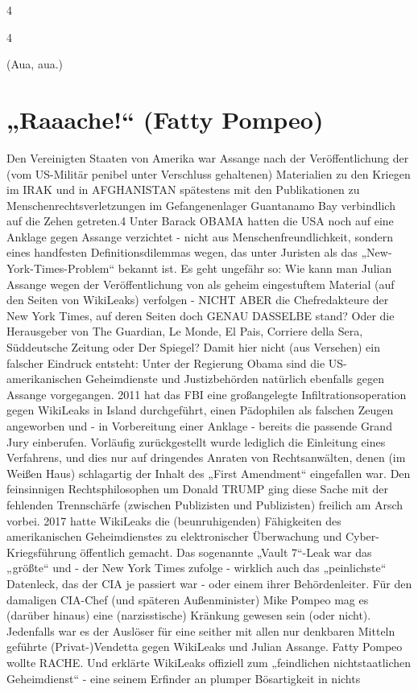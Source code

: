 \begin{multicols}{2}
4

4

(Aua, aua.)


\chapter{„Raaache!“ (Fatty Pompeo)}
Den Vereinigten Staaten von Amerika war Assange nach
der Veröffentlichung der (vom US-Militär penibel unter
Verschluss gehaltenen) Materialien zu den Kriegen im
IRAK und in AFGHANISTAN spätestens mit den Publikationen zu Menschenrechtsverletzungen im Gefangenenlager Guantanamo Bay verbindlich auf die Zehen
getreten.4
Unter Barack OBAMA hatten die USA noch auf eine
Anklage gegen Assange verzichtet - nicht aus Menschenfreundlichkeit, sondern eines handfesten Definitionsdilemmas wegen, das unter Juristen als das
„New-York-Times-Problem“ bekannt ist. Es geht ungefähr so: Wie kann man Julian Assange wegen der Veröffentlichung von als geheim eingestuftem Material (auf
den Seiten von WikiLeaks) verfolgen - NICHT ABER die
Chefredakteure der New York Times, auf deren Seiten
doch GENAU DASSELBE stand? Oder die Herausgeber
von The Guardian, Le Monde, El Pais, Corriere della Sera,
Süddeutsche Zeitung oder Der Spiegel?
Damit hier nicht (aus Versehen) ein falscher Eindruck
entsteht: Unter der Regierung Obama sind die US-amerikanischen Geheimdienste und Justizbehörden natürlich ebenfalls gegen Assange vorgegangen. 2011 hat das
FBI eine großangelegte Infiltrationsoperation gegen WikiLeaks in Island durchgeführt, einen Pädophilen als falschen Zeugen angeworben und - in Vorbereitung einer
Anklage - bereits die passende Grand Jury einberufen.
Vorläufig zurückgestellt wurde lediglich die Einleitung
eines Verfahrens, und dies nur auf dringendes Anraten
von Rechtsanwälten, denen (im Weißen Haus) schlagartig der Inhalt des „First Amendment“ eingefallen war.
Den feinsinnigen Rechtsphilosophen um Donald
TRUMP ging diese Sache mit der fehlenden Trennschärfe (zwischen Publizisten und Publizisten) freilich am
Arsch vorbei.
2017 hatte WikiLeaks die (beunruhigenden) Fähigkeiten
des amerikanischen Geheimdienstes zu elektronischer
Überwachung und Cyber-Kriegsführung öffentlich gemacht. Das sogenannte „Vault 7“-Leak war das „größte“ und - der New York Times zufolge - wirklich auch
das „peinlichste“ Datenleck, das der CIA je passiert war
- oder einem ihrer Behördenleiter. Für den damaligen
CIA-Chef (und späteren Außenminister) Mike Pompeo
mag es (darüber hinaus) eine (narzisstische) Kränkung
gewesen sein (oder nicht). Jedenfalls war es der Auslöser
für eine seither mit allen nur denkbaren Mitteln geführte
(Privat-)Vendetta gegen WikiLeaks und Julian Assange.
Fatty Pompeo wollte RACHE. Und erklärte WikiLeaks offiziell zum „feindlichen nichtstaatlichen Geheimdienst“
- eine seinem Erfinder an plumper Bösartigkeit in nichts


\end{multicols}
